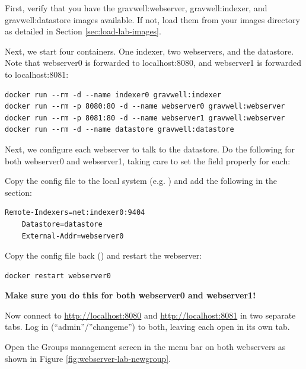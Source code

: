 First, verify that you have the gravwell:webserver, gravwell:indexer, and gravwell:datastore
images available. If not, load them from your images directory as detailed in
Section \ref{sec:load-lab-images}.

Next, we start four containers. One indexer, two webservers, and the
datastore. Note that webserver0 is forwarded to localhost:8080, and
webserver1 is forwarded to localhost:8081:

\begin{Verbatim}[breaklines=true]
docker run --rm -d --name indexer0 gravwell:indexer
docker run --rm -p 8080:80 -d --name webserver0 gravwell:webserver
docker run --rm -p 8081:80 -d --name webserver1 gravwell:webserver
docker run --rm -d --name datastore gravwell:datastore
\end{Verbatim}

Next, we configure each webserver to talk to the datastore. Do the
following for both webserver0 and webserver1, taking care to set the
 field properly for each:

Copy the config file to the local system
(e.g. )
and add the following in the \code{[Global]} section:

\begin{Verbatim}[breaklines=true]
    Remote-Indexers=net:indexer0:9404
    Datastore=datastore
    External-Addr=webserver0
\end{Verbatim}

Copy the config file back ()
and restart the webserver:

\begin{Verbatim}[breaklines=true]
docker restart webserver0
\end{Verbatim}

\textbf{Make sure you do this for both webserver0 and webserver1!}

Now connect to
\href{http://localhost:8080}{http://localhost:8080} and
\href{http://localhost:8081}{http://localhost:8081} in two separate tabs.
Log in (``admin''/''changeme'') to both,
leaving each open in its own tab.

Open the Groups management screen in the menu bar on both webservers as shown in Figure \ref{fig:webserver-lab-newgroup}.

